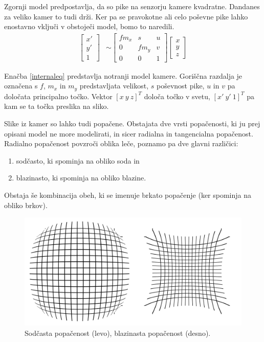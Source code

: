 \documentclass[a4paper, 12pt]{book}
\begin{document}
Zgornji model predpostavlja, da so pike na senzorju kamere kvadratne. Dandanes za veliko kamer to tudi drži. Ker pa se pravokotne ali celo poševne pike lahko enostavno vključi v obstoječi model, bomo to naredili.
\begin{align}
\begin{bmatrix}
x' \\
y' \\
1
\end{bmatrix}
&\sim
\begin{bmatrix}
fm_x & s & u \\
0 & fm_y & v \\
0 & 0 & 1
\end{bmatrix}
\begin{bmatrix}
x \\
y \\
z
\end{bmatrix}
\label{internaleq}
\end{align}

Enačba \eqref{internaleq} predstavlja notranji model kamere. Goriščna razdalja je označena s $f$, $m_x$ in $m_y$ predstavljata velikost, $s$ poševnost pike, $u$ in $v$ pa določata principalno točko. Vektor $[x \ y \ z]^T$ določa točko v svetu, $[x' \ y' \ 1]^T$ pa kam se ta točka preslika na sliko.

Slike iz kamer so lahko tudi popačene. Obstajata dve vrsti popačenosti, ki ju prej opisani model ne more modelirati, in sicer radialna in tangencialna popačenost. Radialno popačenost povzroči oblika leče, poznamo pa dve glavni različici:
\begin{enumerate}
\itemsep0em
\item sodčasto, ki spominja na obliko soda in
\item blazinasto, ki spominja na obliko blazine.
\end{enumerate}
Obstaja še kombinacija obeh, ki se imenuje brkato popačenje (ker spominja na obliko brkov).

\begin{figure}[H]
\centering
\includegraphics[width=\textwidth,height=\textheight,keepaspectratio]{distorsion.png}
\caption{Sodčasta popačenost (levo), blazinasta popačenost (desno).}
\end{figure}
\end{document}
